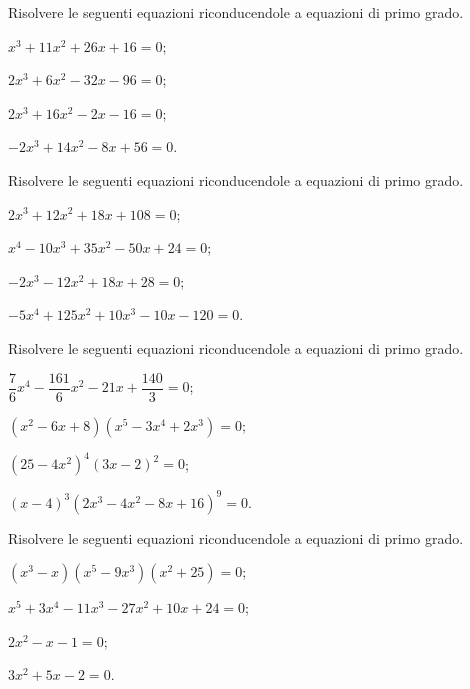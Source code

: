 \begin{esercizio}[\Ast]
\label{ese:17.8}
Risolvere le seguenti equazioni riconducendole a equazioni di primo grado.
\begin{multicols}{2}
\begin{enumeratea}
 \item $x^{3}+11x^{2}+26x+16=0$;
 \item $2x^{3}+6x^{2}-32x-96=0$;
 \item $2x^{3}+16x^{2}-2x-16=0$;
 \item $-2x^{3}+14x^{2}-8x+56=0$.
\end{enumeratea}
\end{multicols}
\end{esercizio}
\begin{esercizio}[\Ast]
\label{ese:17.9}
Risolvere le seguenti equazioni riconducendole a equazioni di primo grado.
\begin{multicols}{2}
\begin{enumeratea}
 \item $2x^{3}+12x^{2}+18x+108=0$;
 \item $x^{4}-10x^{3}+35x^{2}-50x+24=0$;
 \item $-2x^{3}-12x^{2}+18x+28=0$;
 \item $-5x^{4}+125x^{2}+10x^{3}-10x-120=0$.
\end{enumeratea}
\end{multicols}
\end{esercizio}

\begin{esercizio}[\Ast]
\label{ese:17.10}
Risolvere le seguenti equazioni riconducendole a equazioni di primo grado.
\begin{multicols}{2}
\begin{enumeratea}
 \item $\dfrac{7}{6}x^{4}-\dfrac{161}{6}x^{2}-21x+\dfrac{140}{3}=0$;
 \item $(x^{2}-6x+8)(x^{5}-3x^{4}+2x^{3})=0$;
 \item $\left(25-4x^{2}\right)^{4}\left(3x-2\right)^{2}=0$;
 \item $(x-4)^{3}\left(2x^{3}-4x^{2}-8x+16\right)^{9}=0$.
\end{enumeratea}
\end{multicols}
\end{esercizio}

\begin{esercizio}[\Ast]
\label{ese:17.11}
Risolvere le seguenti equazioni riconducendole a equazioni di primo grado.
\begin{multicols}{2}
\begin{enumeratea}
 \item $(x^{3}-x)(x^{5}-9x^{3})(x^{2}+25)=0$;
 \item $x^{5}+3x^{4}-11x^{3}-27x^{2}+10x+24=0$;
 \item $2x^{2}-x-1=0$;
 \item $3x^{2}+5x-2=0$.
\end{enumeratea}
\end{multicols}
\end{esercizio}

